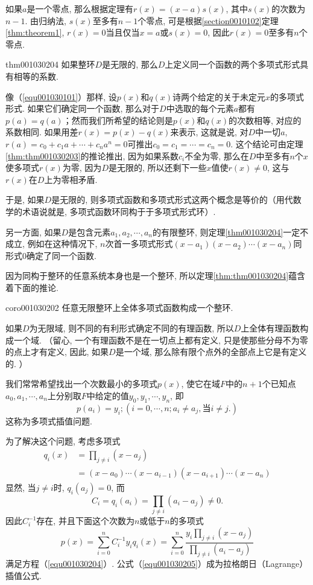 如果$a$是一个零点, 那么根据定理有$r(x)=(x-a)s(x)$, 其中$s(x)$的次数为$n-1$. 由归纳法, $s(x)$至多有$n-1$个零点, 可是根据\ref{section0010102}定理\ref{thm:theorem1}, $r(x)=0$当且仅当$x=a$或$s(x)=0$, 因此$r(x)=0$至多有$n$个零点. 

\begin{theorem}{}{thm001030204}
如果整环$D$是无限的, 那么$D$上定义同一个函数的两个多项式形式具有相等的系数. 
\end{theorem}

像（\ref{equ001030101}）那样, 设$p(x)$和$q(x)$诗两个给定的关于未定元$x$的多项式形式. 如果它们确定同一个函数, 那么对于$D$中选取的每个元素$a$都有$p(a)=q(a)$；然而我们所希望的结论则是$p(x)$和$q(x)$的次数相等, 对应的系数相同. 如果用差$r(x)=p(x)-q(x)$来表示, 这就是说, 对$D$中一切$a$, $r(a)=c_0+c_1a+\cdots+c_na^n=0$可推出$c_0=c_1=\cdots=c_n=0$. 这个结论可由定理\ref{thm:thm001030203}的推论推出, 因为如果系数$c_i$不全为零, 那么在$D$中至多有$n$个$x$使多项式$r(x)$为零, 因为$D$是无限的, 所以还剩下一些$x$值使$r(x) \neq 0$, 这与$r(x)$在$D$上为零相矛盾. 

于是, 如果$D$是无限的, 则多项式函数和多项式形式这两个概念是等价的（用代数学的术语说就是, 多项式函数环同构于于多项式形式环）. 

另一方面, 如果$D$是包含元素$a_1,a_2,\cdots,a_n$的有限整环, 则定理\ref{thm001030204}一定不成立, 例如在这种情况下, $n$次首一多项式形式$(x-a_1)(x-a_2)\cdots(x-a_n)$同形式0确定了同一个函数. 

因为同构于整环的任意系统本身也是一个整环, 所以定理\ref{thm:thm001030204}蕴含着下面的推论. 

\begin{corollary}{}{coro001030202}
任意无限整环上全体多项式函数构成一个整环. 
\end{corollary}

如果$D$为无限域, 则不同的有利形式确定不同的有理函数, 所以$D$上全体有理函数构成一个域. （留心, 一个有理函数不是在一切点上都有定义, 只是使那些分母不为零的点上才有定义, 因此, 如果$D$是一个域, 那么除有限个点外的全部点上它是有定义的. ）

我们常常希望找出一个次数最小的多项式$p(x)$, 使它在域$F$中的$n+1$个已知点$a_0,a_1,\cdots,a_n$上分别取$F$中给定的值$y_0,y_1,\cdots,y_n$, 即
\begin{equation}\label{equ001030204}
p(a_i) = y_i;(i=0,\cdots,n;a_i \neq a_j,\text{当}i\neq j.)
\end{equation}
这称为多项式插值问题. 

为了解决这个问题, 考虑多项式
\[
\begin{aligned}
q_i(x) &= \prod_{j \neq i}{(x-a_j)}\\
&=(x-a_0)\cdots(x-a_{i-1})(x-a_{i+1})\cdots(x-a_n)
\end{aligned}
\]
显然, 当$j \neq i$时, $q_i(a_j)=0$, 而
\[
C_i=q_i(a_i) = \prod_{j \neq i}{(a_i - a_j)} \neq 0.
\]
因此$C_i^{-1}$存在, 并且下面这个次数为$n$或低于$n$的多项式
\begin{equation}\label{equ001030205}
p(x)=\sum_{i=0}^{n}{C_i^{-1}y_iq_i(x)}=\sum_{i=0}^{n}{\frac{y_i\prod_{j \neq i}{(x-a_j)}}{\prod_{j \neq i}{(a_i - a_j)}}}
\end{equation}
满足方程（\ref{equ001030204}）. 公式（\ref{equ001030205}）成为拉格朗日（Lagrange）插值公式. 

